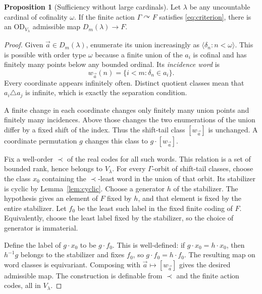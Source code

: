 \documentclass[11pt,letterpaper]{article}
\theoremstyle{definition}
\newtheorem{proposition}[definition]{Proposition}
\numberwithin{equation}{section}
\newcommand{\OD}{\mathrm{OD}}
\newcommand{\acts}{\curvearrowright}
\begin{document}
\begin{proposition}[Sufficiency without large cardinals]\label{prop:sufficiency}
Let $\lambda$ be any uncountable cardinal of cofinality $\omega$. If the finite action $\Gamma\acts F$ satisfies \eqref{eq:criterion}, there is an $\OD_{V_\lambda}$ admissible map $D_m(\lambda)\to F$.
\end{proposition}
\begin{proof}
Given $\vec a\in D_m(\lambda)$, enumerate its union increasingly as $\langle\delta_n:n<\omega\rangle$. This is possible with order type $\omega$ because a finite union of the $a_i$ is cofinal and has finitely many points below any bounded ordinal. Its \emph{incidence word} is
\[
w_{\vec a}(n)=\{i<m:\delta_n\in a_i\}.
\]
Every coordinate appears infinitely often. Distinct quotient classes mean that $a_i\triangle a_j$ is infinite, which is exactly the separation condition.

A finite change in each coordinate changes only finitely many union points and finitely many incidences. Above those changes the two enumerations of the union differ by a fixed shift of the index. Thus the shift-tail class $[w_{\vec a}]$ is unchanged. A coordinate permutation $g$ changes this class to $g\cdot[w_{\vec a}]$.

Fix a well-order $\prec$ of the real codes for all such words. This relation is a set of bounded rank, hence belongs to $V_\lambda$. For every $\Gamma$-orbit of shift-tail classes, choose the class $x_0$ containing the $\prec$-least word in the union of that orbit. Its stabilizer is cyclic by Lemma~\ref{lem:cyclic}. Choose a generator $h$ of the stabilizer. The hypothesis gives an element of $F$ fixed by $h$, and that element is fixed by the entire stabilizer. Let $f_0$ be the least such label in the fixed finite coding of $F$. Equivalently, choose the least label fixed by the stabilizer, so the choice of generator is immaterial.

Define the label of $g\cdot x_0$ to be $g\cdot f_0$. This is well-defined: if $g\cdot x_0=h\cdot x_0$, then $h^{-1}g$ belongs to the stabilizer and fixes $f_0$, so $g\cdot f_0=h\cdot f_0$. The resulting map on word classes is equivariant. Composing with $\vec a\mapsto[w_{\vec a}]$ gives the desired admissible map. The construction is definable from $\prec$ and the finite action codes, all in $V_\lambda$.
\end{proof}
\end{document}

